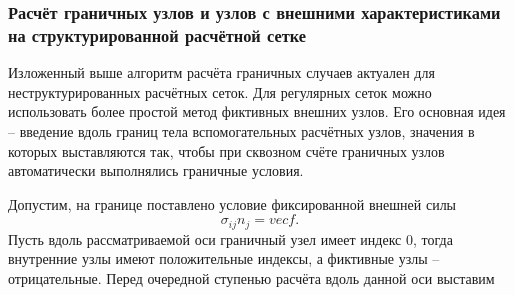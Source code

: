 \subsubsection{Расчёт граничных узлов и узлов с внешними характеристиками на структурированной расчётной сетке}
Изложенный выше алгоритм расчёта граничных случаев актуален для неструктурированных расчётных сеток. Для регулярных сеток можно использовать более простой метод фиктивных внешних узлов. Его основная идея -- введение вдоль границ тела вспомогательных расчётных узлов, значения в которых выставляются так, чтобы при сквозном счёте граничных узлов автоматически выполнялись граничные условия. 

Допустим, на границе поставлено условие фиксированной внешней силы
\begin{equation}
	\sigma_{ij} n_j = vec{f}.
\end{equation}
Пусть вдоль рассматриваемой оси граничный узел имеет индекс 0, тогда внутренние узлы имеют положительные индексы, а фиктивные узлы -- отрицательные. Перед очередной ступенью расчёта вдоль данной оси выставим










